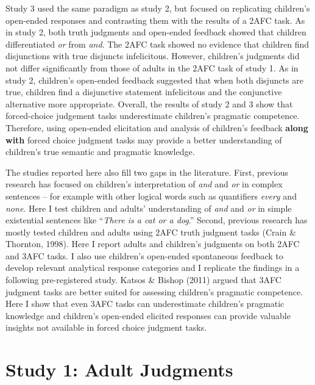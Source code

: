 \documentclass[oneside]{report}
\theoremstyle{definition}
\theoremstyle{definition}
\theoremstyle{definition}
\theoremstyle{remark}
\begin{document}
Study 3 used the same paradigm as study 2, but focused on replicating
children's open-ended responses and contrasting them with the results of
a 2AFC task. As in study 2, both truth judgments and open-ended feedback
showed that children differentiated \emph{or} from \emph{and}. The 2AFC
task showed no evidence that children find disjunctions with true
disjuncts infelicitous. However, children's judgments did not differ
significantly from those of adults in the 2AFC task of study 1. As in
study 2, children's open-ended feedback suggested that when both
disjuncts are true, children find a disjunctive statement infelicitous
and the conjunctive alternative more appropriate. Overall, the results
of study 2 and 3 show that forced-choice judgement tasks underestimate
children's pragmatic competence. Therefore, using open-ended elicitation
and analysis of children's feedback \textbf{along with} forced choice
judgment tasks may provide a better understanding of children's true
semantic and pragmatic knowledge.

The studies reported here also fill two gaps in the literature. First,
previous research has focused on children's interpretation of \emph{and}
and \emph{or} in complex sentences -- for example with other logical
words such as quantifiers \emph{every} and \emph{none}. Here I test
children and adults' understanding of \emph{and} and \emph{or} in simple
existential sentences like ``\emph{There is a cat or a dog}.'' Second,
previous research has mostly tested children and adults using 2AFC truth
judgment tasks (Crain \& Thornton, 1998). Here I report adults and
children's judgments on both 2AFC and 3AFC tasks. I also use children's
open-ended spontaneous feedback to develop relevant analytical response
categories and I replicate the findings in a following pre-registered
study. Katsos \& Bishop (2011) argued that 3AFC judgment tasks are
better suited for assessing children's pragmatic competence. Here I show
that even 3AFC tasks can underestimate children's pragmatic knowledge
and children's open-ended elicited responses can provide valuable
insights not available in forced choice judgment tasks.

\section{Study 1: Adult Judgments}\label{study-1-adult-judgments}
\end{document}
